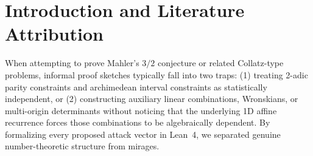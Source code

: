 \documentclass[11pt]{article}
\begin{document}
\begin{abstract}
\begin{enumerate}
  \item \textbf{Finite Positive Seeds vs.\ 2-Adic Paths \& Certified Structural Barriers:} We prove \emph{why} symbolic/2-adic survivors exist in $\mathbb{Z}_2 \times \mathbb{R}$ while failing for positive integers $a_0 \in \mathbb{N}$: the partial sums $\Sigma_m(s) = \sum_{k=1}^m (2/3)^{T(k)+1}$ converge in $\mathbb{R}$ to $(0, 1/3]$ while converging in $\mathbb{Q}_2$ to the negative rational $-\frac{6a_0+2}{3} \le -2/3 < 0$ (\texttt{SubstitutionMahlerMethodAndGrandSynthesis.lean}). In particular, we resolve the $G_{3,6}$ product-graph false-positive cycle $(5,5) \to (4,2) \to (6,3) \to (5,5)$ ($a_0 = -9/19 \in \mathbb{Z}_2$ vs.\ $8^m \mid (19 a_0 + 9)$ and $3m \le W + 4$ for $a_0 < 2^W$) and establish the backward-lifting descent dichotomy (\texttt{FiniteSeedCarryAndBackwardDescent.lean}).
\end{enumerate}
\end{abstract}

\section{Introduction and Literature Attribution}

When attempting to prove Mahler's $3/2$ conjecture or related Collatz-type problems, informal proof sketches typically fall into two traps: (1) treating 2-adic parity constraints and archimedean interval constraints as statistically independent, or (2) constructing auxiliary linear combinations, Wronskians, or multi-origin determinants without noticing that the underlying 1D affine recurrence forces those combinations to be algebraically dependent. By formalizing every proposed attack vector in Lean~4, we separated genuine number-theoretic structure from mirages.
\end{document}
